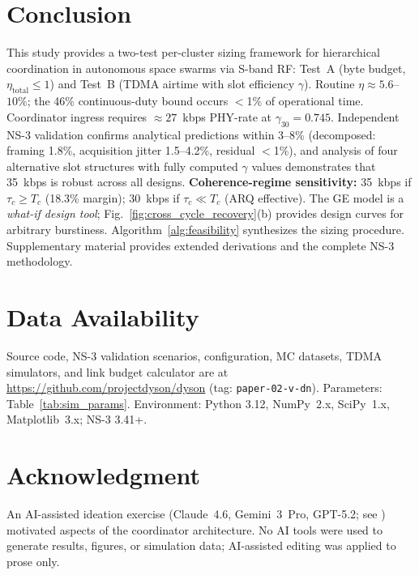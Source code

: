 \documentclass[journal]{IEEEtran}
\begin{document}
\section{Conclusion}

This study provides a two-test per-cluster sizing framework for hierarchical coordination in autonomous space swarms via S-band RF: Test~A (byte budget, $\eta_{\text{total}} \leq 1$) and Test~B (TDMA airtime with slot efficiency $\gamma$). Routine $\eta \approx 5.6$--$10\%$; the 46\% continuous-duty bound occurs $<$1\% of operational time. Coordinator ingress requires ${\approx}27$~kbps PHY-rate at $\gamma_{30} = 0.745$. Independent NS-3 validation confirms analytical predictions within 3--8\% (decomposed: framing 1.8\%, acquisition jitter 1.5--4.2\%, residual $<$1\%), and analysis of four alternative slot structures with fully computed $\gamma$ values demonstrates that 35~kbps is robust across all designs. \textbf{Coherence-regime sensitivity:} 35~kbps if $\tau_c \geq T_c$ (18.3\% margin); 30~kbps if $\tau_c \ll T_c$ (ARQ effective). The GE model is a \emph{what-if design tool}; Fig.~\ref{fig:cross_cycle_recovery}(b) provides design curves for arbitrary burstiness. Algorithm~\ref{alg:feasibility} synthesizes the sizing procedure. Supplementary material provides extended derivations and the complete NS-3 methodology.

\section*{Data Availability}

Source code, NS-3 validation scenarios, configuration, MC datasets, TDMA simulators, and link budget calculator are at \url{https://github.com/projectdyson/dyson} (tag: \texttt{paper-02-v-dn}). Parameters: Table~\ref{tab:sim_params}. Environment: Python 3.12, NumPy~2.x, SciPy~1.x, Matplotlib~3.x; NS-3 3.41+.

\section*{Acknowledgment}

An AI-assisted ideation exercise (Claude~4.6, Gemini~3~Pro, GPT-5.2; see \cite{dyson_multimodel}) motivated aspects of the coordinator architecture. No AI tools were used to generate results, figures, or simulation data; AI-assisted editing was applied to prose only.
\end{document}
